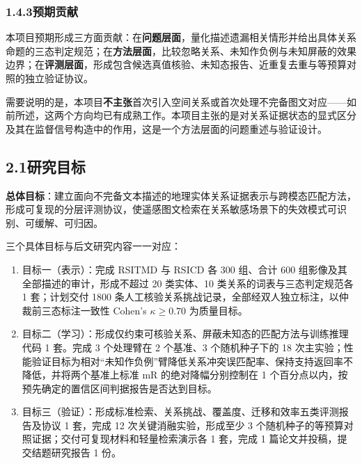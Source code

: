 \subsubsection*{1.4.3\quad 预期贡献}

本项目预期形成三方面贡献：在\textbf{问题层面}，量化描述遗漏相关情形并给出具体关系命题的三态判定规范；在\textbf{方法层面}，比较忽略关系、未知作负例与未知屏蔽的效果边界；在\textbf{评测层面}，形成包含候选真值核验、未知态报告、近重复去重与等预算对照的独立验证协议。

需要说明的是，本项目\textbf{不主张}首次引入空间关系或首次处理不完备图文对应——如前所述，这两个方向均已有成熟工作。本项目主张的是对关系证据状态的显式区分及其在监督信号构造中的作用，这是一个方法层面的问题重述与验证设计。

\MappingBibliography



\subsection*{2.1\quad 研究目标}

\textbf{总体目标}：建立面向不完备文本描述的地理实体关系证据表示与跨模态匹配方法，形成可复现的分层评测协议，使遥感图文检索在关系敏感场景下的失效模式可识别、可缓解、可归因。

三个具体目标与后文研究内容一一对应：

\begin{enumerate}
    \item 目标一（表示）：完成 RSITMD 与 RSICD 各 300 组、合计 600 组影像及其全部描述的审计，形成不超过 20 类实体、10 类关系的词表与三态判定规范各 1 套；计划交付 1800 条人工核验关系挑战记录，全部经双人独立标注，以仲裁前三态标注一致性 Cohen's $\kappa \geq 0.70$ 为质量目标。
    \item 目标二（学习）：形成仅约束可核验关系、屏蔽未知态的匹配方法与训练推理代码 1 套。完成 3 个处理臂在 2 个基准、3 个随机种子下的 18 次主实验；性能验证目标为相对“未知作负例”臂降低关系冲突误匹配率、保持支持返回率不降低，并将两个基准上标准 mR 的绝对降幅分别控制在 1 个百分点以内，按预先确定的置信区间判据报告是否达到目标。
    \item 目标三（验证）：形成标准检索、关系挑战、覆盖度、迁移和效率五类评测报告及协议 1 套，完成 12 次关键消融实验，形成至少 3 个随机种子的等预算对照证据；交付可复现材料和轻量检索演示各 1 套，完成 1 篇论文并投稿，提交结题研究报告 1 份。
\end{enumerate}


